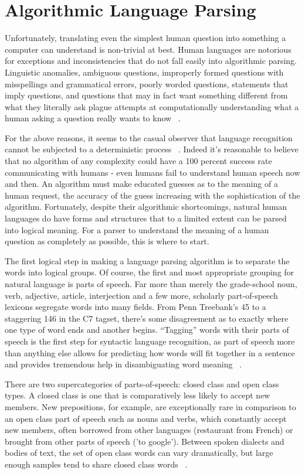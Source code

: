 \documentclass[12pt]{article}
\begin{document}
\section*{Algorithmic Language Parsing}
Unfortunately, translating even the simplest human question into something a computer can understand is non-trivial at best. Human languages are notorious for exceptions and inconsistencies that do not fall easily into algorithmic parsing. Linguistic anomalies, ambiguous questions, improperly formed questions with misspellings and grammatical errors, poorly worded questions, statements that imply questions, and questions that may in fact want something different from what they literally ask plague attempts at computationally understanding what a human asking a question really wants to know ~\citep{Jurafsky}.

For the above reasons, it seems to the casual observer that language recognition cannot be subjected to a deterministic process ~\citep{Marcus}. Indeed it's reasonable to believe that no algorithm of any complexity could have a 100 percent success rate communicating with humans - even humans fail to understand human speech now and then. An algorithm must make educated guesses as to the meaning of a human request, the accuracy of the guess increasing with the sophistication of the algorithm. Fortunately, despite their algorithmic shortcomings, natural human languages do have forms and structures that to a limited extent can be parsed into logical meaning. For a parser to understand the meaning of a human question as completely as possible, this is where to start.

The first logical step in making a language parsing algorithm is to separate the words into logical groups. Of course, the first and most appropriate grouping for natural language is parts of speech. Far more than merely the grade-school noun, verb, adjective, article, interjection and a few more, scholarly part-of-speech lexicons segregate words into many fields. From Penn Treebank's 45 to a staggering 146 in the C7 tagset, there's some disagreement as to exactly where one type of word ends and another begins. ``Tagging'' words with their parts of speech is the first step for syntactic language recognition, as part of speech more than anything else allows for predicting how words will fit together in a sentence and provides tremendous help in disambiguating word meaning ~\citep{Jurafsky}.

There are two supercategories of parts-of-speech: closed class and open class types. A closed class is one that is comparatively less likely to accept new members.  New prepositions, for example, are exceptionally rare in comparison to an open class part of speech such as nouns and verbs, which constantly accept new members, often borrowed from other languages (restaurant from French) or brought from other parts of speech ('to google'). Between spoken dialects and bodies of text, the set of open class words can vary dramatically, but large enough samples tend to share closed class words ~\citep{Jurafsky}. 
\end{document}
